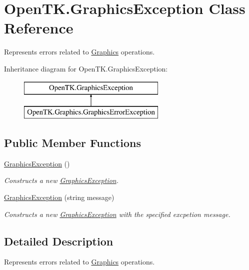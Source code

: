 \hypertarget{class_open_t_k_1_1_graphics_exception}{\section{Open\-T\-K.\-Graphics\-Exception Class Reference}
\label{class_open_t_k_1_1_graphics_exception}
}


Represents errors related to \hyperlink{namespace_open_t_k_1_1_graphics}{Graphics} operations. 


Inheritance diagram for Open\-T\-K.\-Graphics\-Exception\-:\begin{figure}[H]
\begin{center}
\leavevmode
\includegraphics[height=2.000000cm]{class_open_t_k_1_1_graphics_exception}
\end{center}
\end{figure}
\subsection*{Public Member Functions}
\begin{DoxyCompactItemize}
\item 
\hyperlink{class_open_t_k_1_1_graphics_exception_a9052de41342a3608d3e44a00f20cbcbd}{Graphics\-Exception} ()
\begin{DoxyCompactList}\small\item\em Constructs a new \hyperlink{class_open_t_k_1_1_graphics_exception}{Graphics\-Exception}.\end{DoxyCompactList}\item 
\hyperlink{class_open_t_k_1_1_graphics_exception_ada92ccfb2483b704957c961b1d13b8e7}{Graphics\-Exception} (string message)
\begin{DoxyCompactList}\small\item\em Constructs a new \hyperlink{class_open_t_k_1_1_graphics_exception}{Graphics\-Exception} with the specified excpetion message.\end{DoxyCompactList}\end{DoxyCompactItemize}


\subsection{Detailed Description}
Represents errors related to \hyperlink{namespace_open_t_k_1_1_graphics}{Graphics} operations.



